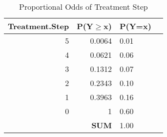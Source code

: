 \documentclass[10pt,a4paper,fleqn]{article}
\begin{document}
\begin{wraptable}{r}{8cm}
\caption{Proportional Odds of Treatment Step}\label{t2}
\centering
\begin{tabular}{rrlr}
  \hline
 Treatment.Step & P(Y$\geq$x) & P(Y=x) \\ 
  \hline
   5 & 0.0064 & 0.01 \\ 
   4 & 0.0621 & 0.06 \\ 
  3 & 0.1312 & 0.07 \\ 
   2 & 0.2343 & 0.10 \\ 
  1 & 0.3963 & 0.16 \\ 
   0 & 1 & 0.60 \\ 
  & \textbf{SUM} & 1.00 \\ 
   \hline
\end{tabular}
\end{wraptable} 
\end{document}
